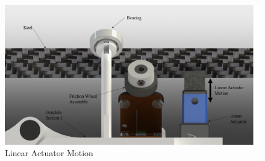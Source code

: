 \documentclass[../main.tex]{subfiles}
\begin{document}
\begin{figure}[H]
	\centering
	\includegraphics[width=.8\linewidth]{img/design/gondola/linearActuatorAndMotor.png}
	\caption{Linear Actuator Motion}
	\label{fig:linearActuatorAndMotor}
\end{figure}
\end{document}
